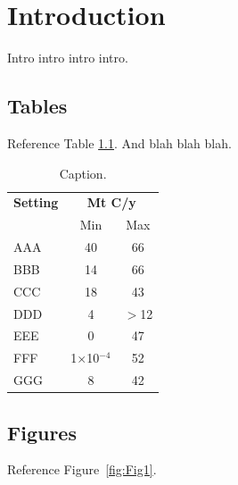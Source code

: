 \chapter{Introduction}
\begin{chapabstract}

Intro intro intro intro.

\end{chapabstract}
\section{Tables}

Reference Table \ref{tab:Table1}.  And blah blah blah.

\begin{table}[t]
\caption[TOC Table Description]{Caption.}
	\centering
	\begin{tabular}{lcc}
		\hline
        {\textbf{Setting}}                      & \multicolumn{2}{c}{\textbf{Mt C/y}} \\
		                                                           &         Min          &     Max      \\ \hline
		AAA                         &          40          &      66      \\
		BBB                               &          14          &      66      \\
		CCC                                       &          18          &      43      \\
		DDD      &          4           &    $>$12     \\
		EEE                                  &          0           &      47      \\
		FFF                    & 1$ \times $10$^{-4}$ &      52      \\
		GGG &          8           &      42      \\ \hline
	\end{tabular}
    \label{tab:Table1}
\end{table}

\section{Figures}
Reference Figure~\ref{fig:Fig1}.

